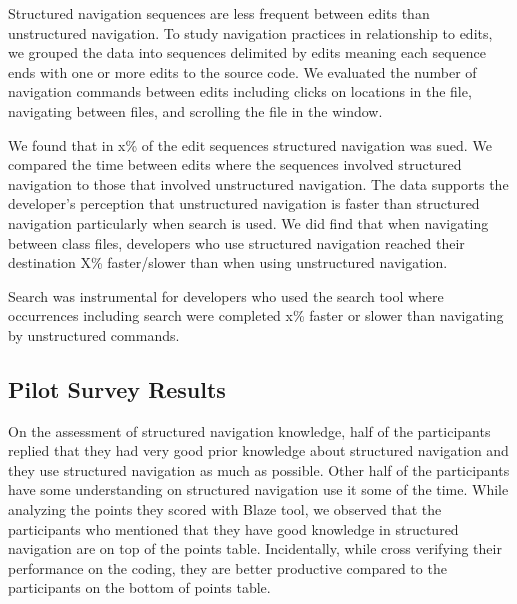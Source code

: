 \documentclass{sig-alternate}
\begin{document}
Structured navigation sequences are less frequent between edits than unstructured navigation.  To study navigation practices in relationship to edits, we grouped the data into sequences delimited by edits meaning each sequence ends with one or more edits to the source code.   We evaluated the number of navigation commands between edits including clicks on locations in the file, navigating between files, and scrolling the file in the window.  

We found that in x\% of the edit sequences structured navigation was sued.  We compared the time between edits where the sequences involved structured navigation to those that involved unstructured navigation.  The data supports the developer's perception that unstructured navigation is faster than structured navigation particularly when search is used.  We did find that when navigating between class files, developers who use structured navigation reached their destination X\% faster/slower than when using unstructured navigation.  

Search was instrumental for developers who used the search tool where occurrences including search were completed x\% faster or slower than navigating by unstructured commands.


\subsection{Pilot Survey Results}

On the assessment of structured navigation knowledge, half of the participants replied that they had very good prior knowledge about structured navigation and they use structured navigation as much as possible.  Other half of the participants have some understanding on structured navigation use it some of the time. While analyzing the points they scored with Blaze tool, we observed that the participants who mentioned that they have good knowledge in structured navigation are on top of the points table. 
Incidentally, while cross verifying their performance on the coding, they are better productive compared to the participants on the bottom of points table.
\end{document}
